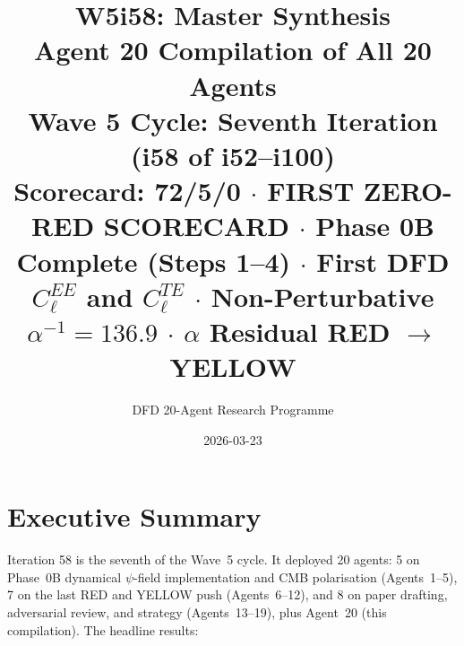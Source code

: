 \documentclass[11pt,a4paper]{article}
\title{\Huge W5i58: Master Synthesis\\[12pt]
\Large Agent 20 Compilation of All 20 Agents\\[6pt]
\large Wave 5 Cycle: Seventh Iteration (i58 of i52--i100)\\[6pt]
\normalsize Scorecard: 72/5/0 $\cdot$ FIRST ZERO-RED SCORECARD $\cdot$ Phase 0B Complete (Steps 1--4) $\cdot$ First DFD $C_\ell^{EE}$ and $C_\ell^{TE}$ $\cdot$ Non-Perturbative $\alpha^{-1} = 136.9$ $\cdot$ $\alpha$ Residual RED $\to$ YELLOW}
\author{DFD 20-Agent Research Programme}
\date{2026-03-23}
\begin{document}
\maketitle


\section{Executive Summary}

Iteration 58 is the seventh of the Wave~5 cycle. It deployed 20 agents: 5 on Phase~0B dynamical $\psi$-field implementation and CMB polarisation (Agents~1--5), 7 on the last RED and YELLOW push (Agents~6--12), and 8 on paper drafting, adversarial review, and strategy (Agents~13--19), plus Agent~20 (this compilation). The headline results:
\end{document}
